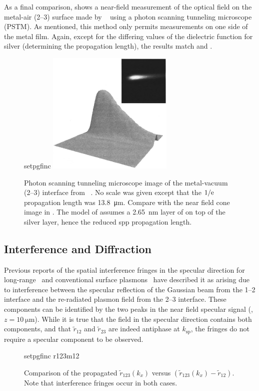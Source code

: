 As a final comparison,  shows a near-field
measurement of the optical field on the metal-air (2--3) surface made by
~\cite{dawson2001surface} using a photon scanning tunneling
microscope (PSTM).  As mentioned, this method only permits measurements on one
side of the metal film.  Again, except for the differing values of the
dielectric function for silver (determining the propagation length), the
results match  and .
\begin{figure}[ht]
  \centering
  {setpgfinc}
  \includegraphics[keepaspectratio,width=6cm]{interference/figures/DawsonTransmitted.jpg}
  \caption{Photon scanning tunneling microscope image of the metal-vacuum (2--3)
    interface from ~\cite{dawson2001surface}.  No scale was
    given except that the $1/{\mathrm{e}}$ propagation length was
    \SI{13.8}{\micro\meter}.  Compare with
    the near field cone image in .  The model of
     assumes a \SI{2.65}{\nano\meter} layer of  on
    top of the silver layer, hence the reduced \gls{spp} propagation length.}
  \label{fig:dawsoncompare}
\end{figure}


\subsection{Interference and Diffraction}
Previous reports of the spatial interference fringes in the specular direction
for long-range~\cite{simon2007observation} and conventional surface
plasmons~\cite{schumann2008near} have described it as arising due to
interference between the specular reflection of the Gaussian beam from the
1--2 interface and the re-radiated plasmon field from the 2--3 interface.
These components can be identified by the two peaks in the near field specular
signal (, $z=\SI{10}{\micro\meter}$).  While it is
true that the field in the specular direction contains both components, and
that $\tilde{r}_{12}$ and $\tilde{r}_{23}$ are indeed antiphase at
$k_\text{sp}$, the fringes do not require a specular component to be observed.
\begin{figure}[ht]
  \centering
  {setpgfinc}
  {r123m12}
  \caption{Comparison of the propagated $\tilde{r}_{123}(k_x)$ versus
    $(\tilde{r}_{123}(k_x)-\tilde{r}_{12})$.  Note that interference fringes occur in
    both cases.  }
  \label{fig:r123m12}
\end{figure}

